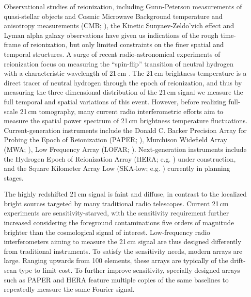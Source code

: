 \documentclass[twocolumn,apj,numberedappendix]{emulateapj}
\renewcommand\[{\begin{equation}}
\renewcommand\]{\end{equation}}
\begin{document}
Observational studies of reionization, including Gunn-Peterson measurements of quasi-stellar objects \citep{Fan2006} and Cosmic Microwave Background temperature and anisotropy measurements (CMB; \citealt{Planck2016}), the Kinetic Sunyaev-Zeldo'vich effect \citep{kszpatchy} and Lyman alpha galaxy observations \citep{mcquinnLyA} have given us indications of the rough time-frame of reionization, but only limited constraints on the finer spatial and temporal structures. A surge of recent radio-astronomical experiments of reionization focus on measuring the ``spin-flip'' transition of neutral
hydrogen with a characteristic wavelength of 21\,cm \citep{Furlanetto2006181,PritchardLoeb}.
The 21\,cm brightness temperature is a direct tracer of neutral hydrogen through the epoch of reionization, and thus by measuring the three dimensional distribution of the 21\,cm signal we measure the full temporal and spatial variations of this event. 
However, before realizing full-scale 21\,cm tomography, many current radio interferometric efforts
aim to measure the spatial power spectrum of 21\,cm brightness temperature fluctuations.
Current-generation instruments include the Donald C. Backer Precision Array for Probing
the Epoch of Reionization (PAPER; \citealt{Ali2015,paper32}), Murchison
Widefield Array (MWA; \citealt{Bowman2013, Tingay2013}), Low Frequency Array (LOFAR; \citealt{LOFAR}). Next-generation instruments include the Hydrogen Epoch of Reionization
Array (HERA; e.g. \citealt{HERA,HERAconfiguration,HERABEAM1,HERADISH2}) under construction, 
and the Square Kilometer Array Low (SKA-low; e.g. \citealt{SKA1}) currently in planning stages. 

The highly redshifted 21\,cm signal is faint and diffuse, in contrast to the localized bright sources targeted by many traditional radio telescopes.  Current 21\,cm experiments are sensitivity-starved, with the sensitivity requirement further increased considering the foreground contaminations five orders of magnitude brighter than the cosmological signal of interest. Low-frequency radio interferometers aiming to measure the 21\,cm signal are thus designed differently from traditional instruments. To satisfy the sensitivity needs, modern arrays are large. Ranging upwards from 100 elements, these arrays are typically of the drift-scan type to limit cost. To further improve sensitivity, specially designed arrays such as PAPER and HERA feature multiple copies of the same baselines to repeatedly measure the same Fourier signal\citep{first-paper}. 
\end{document}
